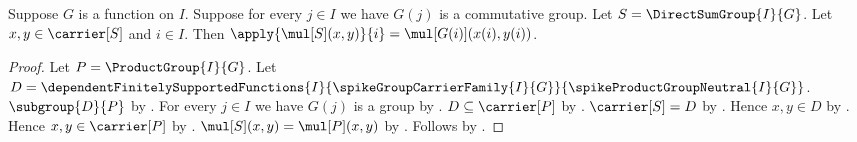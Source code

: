 \begin{proposition}\label{spike_direct_sum_group_mul_coordinate}
    Suppose $G$ is a function on $I$.
    Suppose for every $j\in I$ we have $G(j)$ is a commutative group.
    Let $S=\DirectSumGroup{I}{G}$.
    Let $x,y\in\carrier[S]$ and $i\in I$.
    Then
        $\apply{\mul[S](x,y)}{i}
            =\mul[G(i)](x(i),y(i))$.
\end{proposition}
\begin{proof}
    Let $P=\ProductGroup{I}{G}$.
    Let $D=\dependentFinitelySupportedFunctions
        {I}{\spikeGroupCarrierFamily{I}{G}}{
            \spikeProductGroupNeutral{I}{G}}$.
    $\subgroup{D}{P}$ by
        .
    For every $j\in I$ we have $G(j)$ is a group by
        .
    $D\subseteq\carrier[P]$ by .
    $\carrier[S]=D$ by .
    Hence $x,y\in D$ by \auto.
    Hence $x,y\in\carrier[P]$ by .
    $\mul[S](x,y)=\mul[P](x,y)$ by
        .
    Follows by .
\end{proof}

